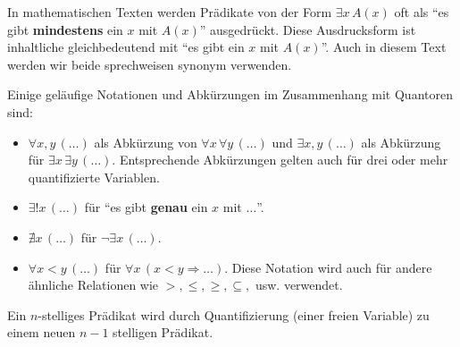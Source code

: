 \begin{rk}
In mathematischen Texten werden Prädikate von der Form $\exists x\,A(x)$ oft als ``es gibt \textbf{mindestens} ein $x$ mit $A(x)$'' ausgedrückt. Diese Ausdrucksform ist inhaltliche gleichbedeutend mit ``es gibt ein $x$ mit $A(x)$''. Auch in diesem Text werden wir beide sprechweisen synonym verwenden.
\end{rk}

\begin{rk}
  Einige geläufige Notationen und Abkürzungen im Zusammenhang mit Quantoren sind:
  \begin{itemize}
  \item $\forall x,y\,(\dots)$ als Abkürzung von $\forall x\,\forall y\, (\dots)$ und $\exists x,y\,(\dots)$ als Abkürzung für $\exists x\,\exists y\,(\dots)$. Entsprechende Abkürzungen gelten auch für drei oder mehr quantifizierte Variablen.
  \item $\exists ! x\,(\dots)$ für ``es gibt \textbf{genau} ein $x$ mit $\dots$''.
  \item $\nexists x\,(\dots)$ für $\neg\exists x\,(\dots)$.
  \item $\forall x<y\,(\dots)$ für $\forall x\,(x<y\Rightarrow \dots)$. Diese Notation wird auch für andere ähnliche Relationen wie $ >,\leq, \geq, \subseteq, $ usw. verwendet.
\end{itemize}
\end{rk}

\begin{rk}
Ein $n$-stelliges Prädikat wird durch Quantifizierung (einer freien Variable) zu einem neuen $n-1$ stelligen Prädikat.
\end{rk}


